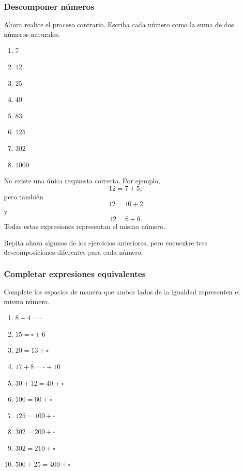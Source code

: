 \subsubsection*{Descomponer números}

Ahora realice el proceso contrario. Escriba cada número como la suma de dos números naturales.

\begin{enumerate}
\item \(7\)

\item \(12\)

\item \(25\)

\item \(40\)

\item \(83\)

\item \(125\)

\item \(302\)

\item \(1000\)
\end{enumerate}

No existe una única respuesta correcta. Por ejemplo,
\[
12=7+5,
\]
pero también
\[
12=10+2
\]
y
\[
12=6+6.
\]
Todas estas expresiones representan el mismo número.

Repita ahora algunos de los ejercicios anteriores, pero encuentre tres descomposiciones diferentes para cada número.

\subsubsection*{Completar expresiones equivalentes}

Complete los espacios de manera que ambos lados de la igualdad representen el mismo número.

\begin{enumerate}
\item \(8+4=\square\)

\item \(15=\square+6\)

\item \(20=13+\square\)

\item \(17+8=\square+10\)

\item \(30+12=40+\square\)

\item \(100=60+\square\)

\item \(125=100+\square\)

\item \(302=200+\square\)

\item \(302=210+\square\)

\item \(500+25=400+\square\)
\end{enumerate}

